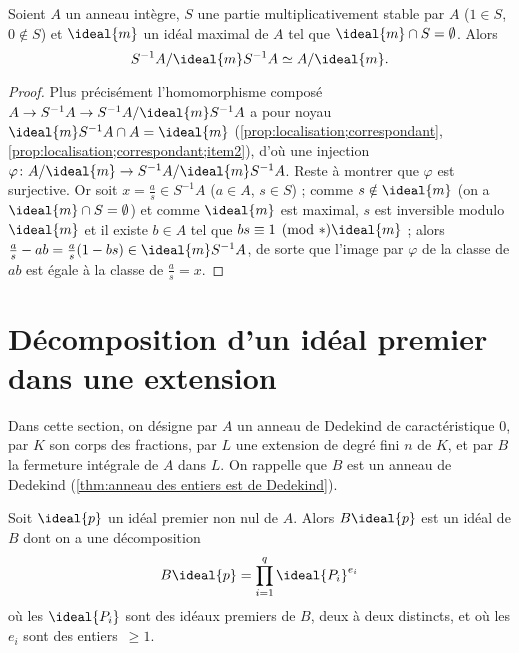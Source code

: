 \documentclass[11pt, useosf,
  title in boldface,
  theorem in new line,
  theorem numbering = section,
  number theorems separately,
]{simplivre}
\begin{document}
    \begin{proposition}\label{prop:quotient et localisation}
        Soient \( A \) un anneau intègre, \( S \) une partie multiplicativement stable par \( A \) (\( 1 \in S \), \( 0 \notin S \)) et \( \ideal{m} \) un idéal maximal de \( A \) tel que \( \ideal{m} \cap S = \emptyset \). Alors
        \[
            S^{-1} A / \ideal{m} S^{-1} A \simeq A/\ideal{m}.
        \]
    \end{proposition}
    \begin{proof}
        Plus précisément l'homomorphisme composé \( A \to S^{-1} A \to S^{-1} A / \ideal{m} S^{-1} A \) a pour noyau \( \ideal{m} S^{-1} A \cap A = \ideal{m} \) (\cref{prop:localisation;correspondant}, \ref{prop:localisation;correspondant;item2}), d'où une injection \( \varphi \colon A/\ideal{m} \to S^{-1} A / \ideal{m} S^{-1} A \). Reste à montrer que \( \varphi \) est surjective. Or soit \( x = \frac{a}{s} \in S^{-1} A \) (\( a \in A \), \( s \in S \)) ; comme \( s \notin \ideal{m} \) (on a \( \ideal{m} \cap S = \emptyset \)) et comme \( \ideal{m} \) est maximal, \( s \) est inversible modulo \( \ideal{m} \) et il existe \( b \in A \) tel que \( bs \equiv 1 \pmod*{\ideal{m}} \) ; alors \( \frac{a}{s} - ab = \frac{a}{s} (1-bs) \in \ideal{m} S^{-1} A \), de sorte que l'image par \( \varphi \) de la classe de \( ab \) est égale à la classe de \( \frac{a}{s} = x \).
    \end{proof}

\section{Décomposition d'un idéal premier dans une extension}\label{sec:décomposition d'un idéal premier dans une extension}

    Dans cette section, on désigne par \( A \) un anneau de Dedekind de caractéristique \( 0 \), par \( K \) son corps des fractions, par \( L \) une extension de degré fini \( n \) de \( K \), et par \( B \) la fermeture intégrale de \( A \) dans \( L \). On rappelle que \( B \) est un anneau de Dedekind (\cref{thm:anneau des entiers est de Dedekind}).

    \medskip
    Soit \( \ideal{p} \) un idéal premier non nul de \( A \). Alors \( B \ideal{p} \) est un idéal de \( B \) dont on a une décomposition
    \begin{equation}\label{eq:décomposition d'idéal dans une extension}
        B \ideal{p} = \prod_{i=1}^q \ideal{P_i}^{e_i}
    \end{equation}
    où les \( \ideal{P_i} \) sont des idéaux premiers de \( B \), deux à deux distincts, et où les \( e_i \) sont des entiers~\( \geqslant 1 \).
\end{document}
